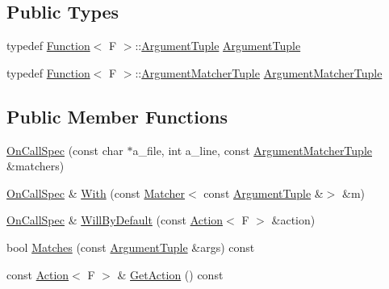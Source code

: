 \subsection*{Public Types}
\begin{DoxyCompactItemize}
\item 
typedef \hyperlink{structtesting_1_1internal_1_1_function}{Function}$<$ F $>$\+::\hyperlink{classtesting_1_1internal_1_1_on_call_spec_a70ffab8b915b7b48a90f5ce256da806f}{Argument\+Tuple} \hyperlink{classtesting_1_1internal_1_1_on_call_spec_a70ffab8b915b7b48a90f5ce256da806f}{Argument\+Tuple}
\item 
typedef \hyperlink{structtesting_1_1internal_1_1_function}{Function}$<$ F $>$\+::\hyperlink{classtesting_1_1internal_1_1_on_call_spec_a3240f159f0a9d8cda208bc256da35074}{Argument\+Matcher\+Tuple} \hyperlink{classtesting_1_1internal_1_1_on_call_spec_a3240f159f0a9d8cda208bc256da35074}{Argument\+Matcher\+Tuple}
\end{DoxyCompactItemize}
\subsection*{Public Member Functions}
\begin{DoxyCompactItemize}
\item 
\hyperlink{classtesting_1_1internal_1_1_on_call_spec_ac7077e8162a10714e463b64a3cc7d054}{On\+Call\+Spec} (const char $\ast$a\+\_\+file, int a\+\_\+line, const \hyperlink{classtesting_1_1internal_1_1_on_call_spec_a3240f159f0a9d8cda208bc256da35074}{Argument\+Matcher\+Tuple} \&matchers)
\item 
\hyperlink{classtesting_1_1internal_1_1_on_call_spec}{On\+Call\+Spec} \& \hyperlink{classtesting_1_1internal_1_1_on_call_spec_a4d9152c0f74245670a1222aae2262d5e}{With} (const \hyperlink{classtesting_1_1_matcher}{Matcher}$<$ const \hyperlink{classtesting_1_1internal_1_1_on_call_spec_a70ffab8b915b7b48a90f5ce256da806f}{Argument\+Tuple} \&$>$ \&m)
\item 
\hyperlink{classtesting_1_1internal_1_1_on_call_spec}{On\+Call\+Spec} \& \hyperlink{classtesting_1_1internal_1_1_on_call_spec_a1c6303bf46983f20f4d2a61752fa8663}{Will\+By\+Default} (const \hyperlink{classtesting_1_1_action}{Action}$<$ F $>$ \&action)
\item 
bool \hyperlink{classtesting_1_1internal_1_1_on_call_spec_a8113d1ec5775715637a87875dee6cc68}{Matches} (const \hyperlink{classtesting_1_1internal_1_1_on_call_spec_a70ffab8b915b7b48a90f5ce256da806f}{Argument\+Tuple} \&args) const
\item 
const \hyperlink{classtesting_1_1_action}{Action}$<$ F $>$ \& \hyperlink{classtesting_1_1internal_1_1_on_call_spec_a3ef8e41380326823fb5b701f3c52cdb6}{Get\+Action} () const
\end{DoxyCompactItemize}
